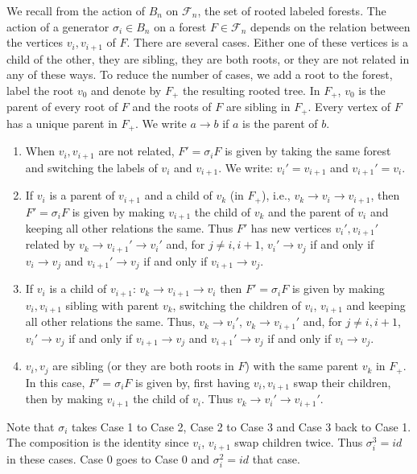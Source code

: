 \documentclass[11pt]{amsart}
\theoremstyle{definition}
\theoremstyle{remark}
\numberwithin{equation}{section}
\newcommand{\cF}{\ensuremath{{\mathcal{F}}}}
\begin{document}
We recall from \cite{Ig-Sen} the action of $B_n$ on $\cF_n$, the set of rooted labeled forests. The action of a generator $\sigma_i\in B_n$ on a forest $F\in\cF_n$ depends on the relation between the vertices $v_i,v_{i+1}$ of $F$. There are several cases. Either one of these vertices is a child of the other, they are sibling, they are both roots, or they are not related in any of these ways. To reduce the number of cases, we add a root to the forest, label the root $v_0$ and denote by $F_+$ the resulting rooted tree. In $F_+$, $v_0$ is the parent of every root of $F$ and the roots of $F$ are sibling in $F_+$. Every vertex of $F$ has a unique parent in $F_+$. We write $a\to b$ if $a$ is the parent of $b$.
\begin{enumerate}
\item[(0)] When $v_i,v_{i+1}$ are not related, $F'=\sigma_iF$ is given by taking the same forest and switching the labels of $v_i$ and $v_{i+1}$. We write: $v_i'=v_{i+1}$ and $v_{i+1}'=v_i$.
\item If $v_i$ is a parent of $v_{i+1}$ and a child of $v_k$ (in $F_+$), i.e., $v_k\to v_i\to v_{i+1}$, then $F'=\sigma_iF$ is given by making $v_{i+1}$ the child of $v_k$ and the parent of $v_i$ and keeping all other relations the same. Thus $F'$ has new vertices $v_i',v_{i+1}'$ related by $v_k\to v_{i+1}'\to v_i'$ and, for $j\neq i,i+1$, $v_i'\to v_j$ if and only if $v_i\to v_j$ and $v_{i+1}'\to v_j$ if and only if $v_{i+1}\to v_j$.
\item If $v_i$ is a child of $v_{i+1}$: $v_k\to v_{i+1}\to v_i$ then $F'=\sigma_iF$ is given by making $v_i,v_{i+1}$ sibling with parent $v_k$, switching the children of $v_i$, $v_{i+1}$ and keeping all other relations the same. Thus, $v_k\to v_i'$, $v_k\to v_{i+1}'$ and, for $j\neq i,i+1$, $v_i'\to v_j$ if and only if $v_{i+1}\to v_j$ and $v_{i+1}'\to v_j$ if and only if $v_i\to v_j$.
\item $v_i,v_j$ are sibling (or they are both roots in $F$) with the same parent $v_k$ in $F_+$. In this case, $F'=\sigma_iF$ is given by, first having $v_i,v_{i+1}$ swap their children, then by making $v_{i+1}$ the child of $v_i$. Thus $v_k\to v_i'\to v_{i+1}'$.
\end{enumerate}

Note that $\sigma_i$ takes Case 1 to Case 2, Case 2 to Case 3 and Case 3 back to Case 1. The composition is the identity since $v_i$, $v_{i+1}$ swap children twice. Thus $\sigma_i^3=id$ in these cases. Case 0 goes to Case 0 and $\sigma_i^2=id$ that case.
\end{document}
